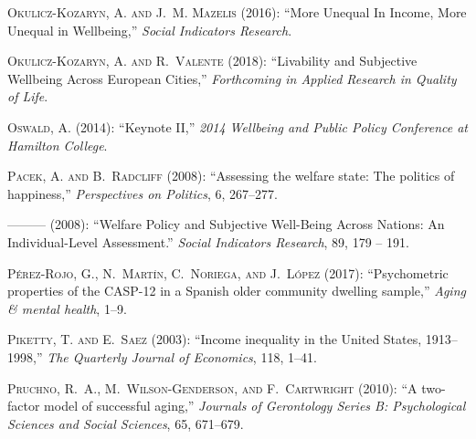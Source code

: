 \documentclass[10pt, letterpaper]{article}
\begin{document}
\begin{spacing}{1.4}
\begin{thebibliography}{91}
\textsc{Okulicz-Kozaryn, A. and J.~M. Mazelis} (2016): \enquote{More Unequal In
  Income, More Unequal in Wellbeing,} \emph{Social Indicators Research}.

\textsc{Okulicz-Kozaryn, A. and R.~Valente} (2018): \enquote{Livability and
  Subjective Wellbeing Across European Cities,} \emph{Forthcoming in Applied
  Research in Quality of Life}.

\textsc{Oswald, A.} (2014): \enquote{Keynote II,} \emph{2014 Wellbeing and
  Public Policy Conference at Hamilton College}.

\textsc{Pacek, A. and B.~Radcliff} (2008{}): \enquote{Assessing the
  welfare state: The politics of happiness,} \emph{Perspectives on Politics},
  6, 267--277.

---\hspace{-.1pt}---\hspace{-.1pt}--- (2008{}): \enquote{Welfare
  Policy and Subjective Well-Being Across Nations: An Individual-Level
  Assessment.} \emph{Social Indicators Research}, 89, 179 -- 191.

\textsc{P{\'e}rez-Rojo, G., N.~Mart{\'\i}n, C.~Noriega, and J.~L{\'o}pez}
  (2017): \enquote{Psychometric properties of the CASP-12 in a Spanish older
  community dwelling sample,} \emph{Aging \& mental health}, 1--9.

\textsc{Piketty, T. and E.~Saez} (2003): \enquote{Income inequality in the
  United States, 1913--1998,} \emph{The Quarterly Journal of Economics}, 118,
  1--41.

\textsc{Pruchno, R.~A., M.~Wilson-Genderson, and F.~Cartwright}
  (2010{}): \enquote{A two-factor model of successful aging,}
  \emph{Journals of Gerontology Series B: Psychological Sciences and Social
  Sciences}, 65, 671--679.


\end{thebibliography}
\end{spacing}
\end{document}
